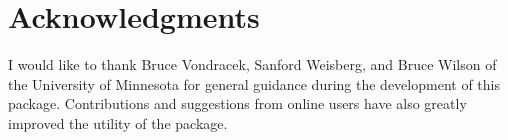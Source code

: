 \documentclass[article,shortnames]{jss}\usepackage[]{graphicx}\usepackage[]{color}
\begin{document}
\section[Acknowledgments]{Acknowledgments}
 
I would like to thank Bruce Vondracek, Sanford Weisberg, and Bruce Wilson of the University of Minnesota for general guidance during the development of this package.  Contributions and suggestions from online users have also greatly improved the utility of the package.    



\end{document}

